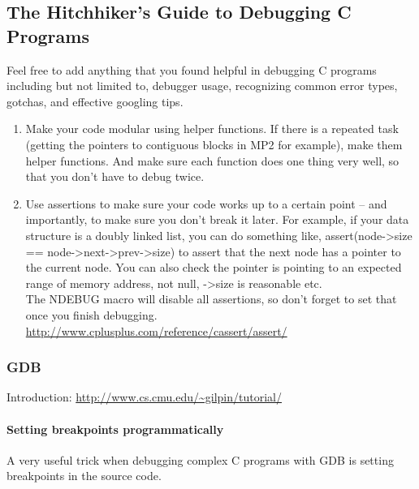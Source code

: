 \subsection{The Hitchhiker's Guide to Debugging C
Programs}\label{the-hitchhikers-guide-to-debugging-c-programs}

Feel free to add anything that you found helpful in debugging C programs
including but not limited to, debugger usage, recognizing common error
types, gotchas, and effective googling tips.

\begin{enumerate}
\item
  Make your code modular using helper functions. If there is a repeated
  task (getting the pointers to contiguous blocks in MP2 for example),
  make them helper functions. And make sure each function does one thing
  very well, so that you don't have to debug twice.
\item
  Use assertions to make sure your code works up to a certain point --
  and importantly, to make sure you don't break it later. For example,
  if your data structure is a doubly linked list, you can do something
  like, assert(node-\textgreater{}size ==
  node-\textgreater{}next-\textgreater{}prev-\textgreater{}size) to
  assert that the next node has a pointer to the current node. You can
  also check the pointer is pointing to an expected range of memory
  address, not null, -\textgreater{}size is reasonable etc.\\The NDEBUG
  macro will disable all assertions, so don't forget to set that once
  you finish debugging.
  \url{http://www.cplusplus.com/reference/cassert/assert/}
\end{enumerate}

\subsubsection{GDB}\label{gdb}

Introduction: \url{http://www.cs.cmu.edu/~gilpin/tutorial/}

\paragraph{Setting breakpoints
programmatically}\label{setting-breakpoints-programmatically}

A very useful trick when debugging complex C programs with GDB is
setting breakpoints in the source code.

\begin{Shaded}
\begin{Highlighting}[]
 
     \NormalTok{;}
    \NormalTok{;}
    \NormalTok{); }
    \NormalTok{;}
\NormalTok{\}}
\end{Highlighting}
\end{Shaded}

